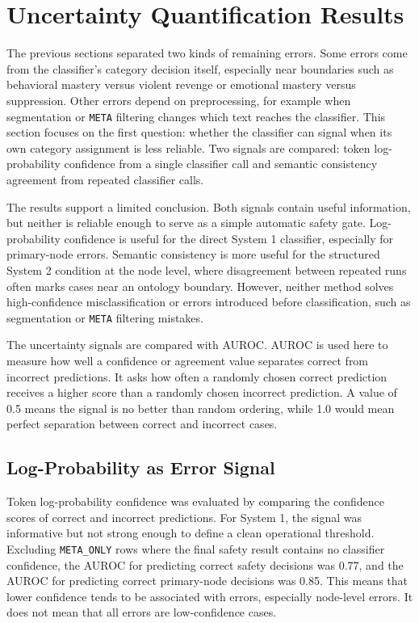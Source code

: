 \section{Uncertainty Quantification Results}

The previous sections separated two kinds of remaining errors. Some errors come from
the classifier's category decision itself, especially near boundaries such as
behavioral mastery versus violent revenge or emotional mastery versus suppression.
Other errors depend on preprocessing, for example when segmentation or \texttt{META}
filtering changes which text reaches the classifier. This section focuses on the first
question: whether the classifier can signal when its own category assignment is less
reliable. Two signals are compared: token log-probability confidence from a single
classifier call and semantic consistency agreement from repeated classifier calls.

The results support a limited conclusion. Both signals contain useful information, but
neither is reliable enough to serve as a simple automatic safety gate. Log-probability
confidence is useful for the direct System 1 classifier, especially for primary-node
errors. Semantic consistency is more useful for the structured System 2 condition at
the node level, where disagreement between repeated runs often marks cases near an
ontology boundary. However, neither method solves high-confidence misclassification or
errors introduced before classification, such as segmentation or \texttt{META}
filtering mistakes.

The uncertainty signals are compared with AUROC. AUROC is used here to measure how well
a confidence or agreement value separates correct from incorrect predictions. It asks
how often a randomly chosen correct prediction receives a higher score than a randomly
chosen incorrect prediction. A value of 0.5 means the signal is no better than random
ordering, while 1.0 would mean perfect separation between correct and incorrect cases.

\subsection{Log-Probability as Error Signal}

Token log-probability confidence was evaluated by comparing the confidence scores of
correct and incorrect predictions. For System 1, the signal was informative but not
strong enough to define a clean operational threshold. Excluding \texttt{META\_ONLY}
rows where the final safety result contains no classifier confidence, the AUROC for
predicting correct safety decisions was 0.77, and the AUROC for predicting correct
primary-node decisions was 0.85. This means that lower confidence tends to be
associated with errors, especially node-level errors. It does not mean that all errors
are low-confidence cases.

